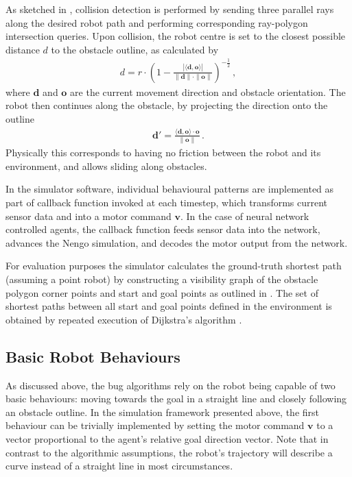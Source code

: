 \documentclass[letterpaper,10pt,conference]{ieeeconf}
\renewcommand{\vec}[1]{\bm{#1}}
\begin{document}
As sketched in , collision detection is performed by sending three parallel rays along the desired robot path and performing corresponding ray-polygon intersection queries. Upon collision, the robot centre is set to the closest possible distance $d$ to the obstacle outline, as calculated by
\begin{align*}
	d = r \cdot \left(1 - \frac{|\langle \vec d, \vec o \rangle |}{\|\vec d\| \cdot \|\vec o\|} \right)^{-\frac{1}2} \,,
\end{align*}
where $\vec d$ and $\vec o$ are the current movement direction and obstacle orientation. The robot then continues along the obstacle, by projecting the direction onto the outline
\begin{align*}
	\vec d' = \frac{\langle \vec d, \vec o \rangle \cdot \vec o}{\| \vec o \|} \,.
\end{align*}
Physically this corresponds to having no friction between the robot and its environment, and allows sliding along obstacles.

In the simulator software, individual behavioural patterns are implemented as part of callback function invoked at each timestep, which transforms current sensor data and into a motor command $\vec v$. In the case of neural network controlled agents, the callback function feeds sensor data into the network, advances the Nengo simulation, and decodes the motor output from the network.

For evaluation purposes the simulator calculates the ground-truth shortest path (assuming a point robot) by constructing a visibility graph of the obstacle polygon corner points and start and goal points as outlined in \cite{bullo2016lectures}. The set of shortest paths between all start and goal points defined in the environment is obtained by repeated execution of Dijkstra's algorithm \cite{dijkstra1959note}.

\subsection{Basic Robot Behaviours}

As discussed above, the bug algorithms rely on the robot being capable of two basic behaviours: moving towards the goal in a straight line and closely following an obstacle outline. In the simulation framework presented above, the first behaviour can be trivially implemented by setting the motor command $\vec v$ to a vector proportional to the agent's relative goal direction vector. Note that in contrast to the algorithmic assumptions, the robot's trajectory will describe a curve instead of a straight line in most circumstances.
\end{document}
